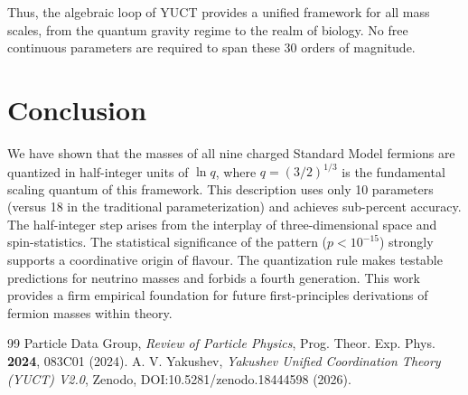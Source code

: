 \documentclass[12pt,a4paper]{article}
\begin{document}
Thus, the algebraic loop of YUCT provides a unified framework for all mass
scales, from the quantum gravity regime to the realm of biology.  No free
continuous parameters are required to span these 30 orders of magnitude.

	\section{Conclusion}
	
	We have shown that the masses of all nine charged Standard Model fermions are quantized in half-integer units of $\ln q$, where $q = (3/2)^{1/3}$ is the fundamental scaling quantum of this framework. This description uses only 10 parameters (versus 18 in the traditional parameterization) and achieves sub-percent accuracy. The half-integer step arises from the interplay of three-dimensional space and spin-statistics. The statistical significance of the pattern ($p < 10^{-15}$) strongly supports a coordinative origin of flavour. The quantization rule makes testable predictions for neutrino masses and forbids a fourth generation. This work provides a firm empirical foundation for future first-principles derivations of fermion masses within theory.
	
	\begin{thebibliography}{99}
		 Particle Data Group, \textit{Review of Particle Physics}, Prog. Theor. Exp. Phys. \textbf{2024}, 083C01 (2024).
		 A. V. Yakushev, \textit{Yakushev Unified Coordination Theory (YUCT) V2.0}, Zenodo, DOI:10.5281/zenodo.18444598 (2026).
	\end{thebibliography}
	
\end{document}
